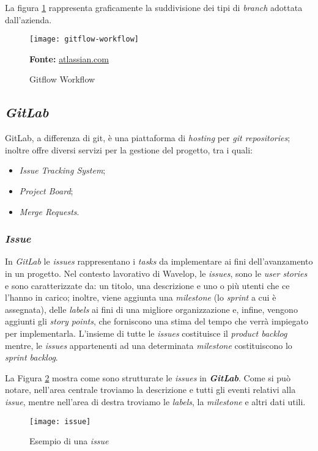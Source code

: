 La figura \ref{fig:gitflow} rappresenta graficamente la suddivisione dei tipi di \emph{branch} adottata dall'azienda.
\vspace{10pt}
  \begin{figure}[!ht]
    \begin{center}
      \texttt{[image: gitflow-workflow]}
      \caption{Gitflow Workflow}
      \textbf{Fonte:} \href{https://www.atlassian.com}{atlassian.com}
      \label{fig:gitflow}
    \end{center}
  \end{figure}
\vspace{10pt} 

\newpage
\subsection{\emph{GitLab}}
GitLab, a differenza di git, è una piattaforma di \emph{hosting} per \emph{git repositories}; inoltre offre diversi servizi per la gestione del progetto, tra i quali:
\begin{itemize}
  \item \emph{Issue Tracking System};
  \item \emph{Project Board};
  \item \emph{Merge Requests}.
\end{itemize}

\subsubsection{\emph{Issue}}
In \emph{GitLab} le \emph{issues} rappresentano i \emph{tasks} da implementare ai fini dell'avanzamento in un progetto. 
Nel contesto lavorativo di Wavelop, le \emph{issues}, sono le \emph{user stories} e sono caratterizzate da: un titolo, una descrizione e uno o più utenti che ce l'hanno in carico; inoltre, viene aggiunta una \emph{milestone} (lo \emph{sprint} a cui è assegnata), delle \emph{labels} ai fini di una migliore organizzazione e, infine, vengono aggiunti gli \emph{story points}, che forniscono una stima del tempo che verrà impiegato per implementarla.
L'insieme di tutte le \emph{issues} costituisce il \emph{product backlog} mentre, le \emph{issues} appartenenti ad una determinata \emph{milestone} costituiscono lo \emph{sprint backlog}.

La Figura \ref{fig:issue} mostra come sono strutturate le \emph{issues} in \textbf{\emph{GitLab}}. 
Come si può notare, nell'area centrale troviamo la descrizione e tutti gli eventi relativi alla \emph{issue}, mentre nell'area di destra troviamo le \emph{labels}, la \emph{milestone} e altri dati utili.
\begin{figure}[!ht]
  \begin{center}
    \texttt{[image: issue]}
    \caption{Esempio di una \emph{issue}}
    \label{fig:issue}
  \end{center}
\end{figure}


